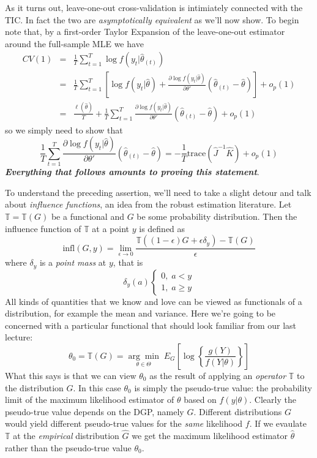 \documentclass[12pt]{article}
\theoremstyle{definition}
\begin{document}
As it turns out, leave-one-out cross-validation is intimiately connected with the TIC. In fact the two are \emph{asymptotically equivalent} as we'll now show. To begin note that, by a first-order Taylor Expansion of the leave-one-out estimator around the full-sample MLE we have
	\begin{eqnarray*}
		CV(1) &=& \frac{1}{T} \sum_{t=1}^T \log f(y_t|\widehat{\theta}_{(t)})\\
			&=&\frac{1}{T} \sum_{t=1}^T \left[\log f(y_t|\widehat{\theta}) + \frac{\partial \log f(y_t|\widehat{\theta})}{\partial \theta'}\left(\widehat{\theta}_{(t)} - \widehat{\theta} \right) \right] + o_p(1)\\
			&=& \frac{\ell(\widehat{\theta})}{T} + \frac{1}{T}\sum_{t=1}^T \frac{\partial \log f(y_t|\widehat{\theta})}{\partial \theta'}\left(\widehat{\theta}_{(t)} - \widehat{\theta} \right) + o_p(1)
	\end{eqnarray*}
so we simply need to show that
	$$\frac{1}{T}\sum_{t=1}^T \frac{\partial \log f(y_t|\widehat{\theta})}{\partial \theta'}\left(\widehat{\theta}_{(t)} - \widehat{\theta} \right) = -\frac{1}{T}\mbox{trace}\left(\widehat{J}^{-1} \widehat{K} \right) + o_p(1)$$
\textbf{\emph{Everything that follows amounts to proving this statement}}. 

To understand the preceding assertion, we'll need to take a slight detour and talk about \emph{influence functions}, an idea from the robust estimation literature. Let $\mathbb{T}=\mathbb{T}(G)$ be a functional and $G$ be some probability distribution. Then the influence function of $\mathbb{T}$ at a point $y$ is defined as 
	$$\mbox{infl}(G,y) = \lim_{\epsilon \rightarrow 0} \frac{\mathbb{T}\left(\left(1-\epsilon\right)G + \epsilon \delta_y\right) - \mathbb{T}(G)}{\epsilon}$$
where $\delta_y$ is a \emph{point mass} at $y$, that is
		$$\delta_y(a)\left\{\begin{array}{c} 0, \; a<y \\ 1, \; a\geq y\end{array} \right.$$
 All kinds of quantities that we know and love can be viewed as functionals of a distribution, for example the mean and variance. Here we're going to be concerned with a particular functional that should look familiar from our last lecture:
	$$\theta_0 = \mathbb{T}(G) = \underset{\theta \in \Theta}{\arg \min} \;E_G\left[\log\left\{\frac{g(Y)}{f(Y|\theta)} \right\} \right]$$
What this says is that we can view $\theta_0$ as the result of applying an \emph{operator} $\mathbb{T}$ to the distribution $G$. In this case $\theta_0$ is simply the pseudo-true value: the probability limit of the maximum likelihood estimator of $\theta$ based on $f(y|\theta)$. Clearly the pseudo-true value depends on the DGP, namely $G$. Different distributions $G$ would yield different pseudo-true values for the \emph{same} likelihood $f$. If we evaulate $\mathbb{T}$ at the \emph{empirical} distribution $\widehat{G}$ we get the maximum likelihood estimator $\widehat{\theta}$ rather than the pseudo-true value $\theta_0$.
\end{document}
